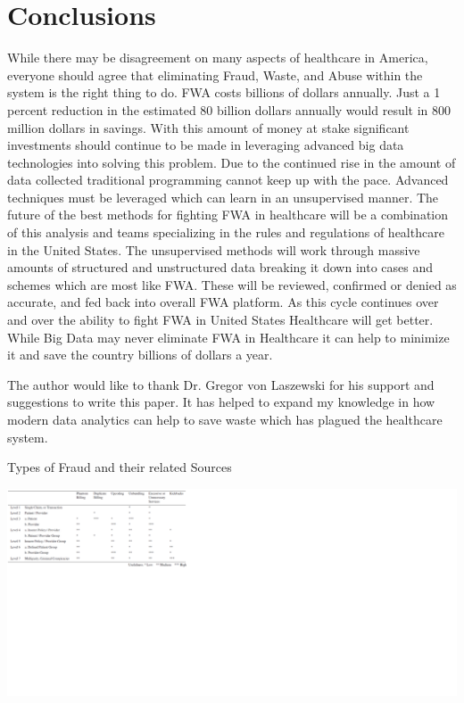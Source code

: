 \documentclass[sigconf]{acmart}
\begin{document}
\section{Conclusions}

While there may be disagreement on many aspects of healthcare in America, everyone should agree 
that eliminating Fraud, Waste, and Abuse within the system is the right thing to do.  FWA costs 
billions of dollars annually.  Just a 1 percent reduction in the estimated 80 billion dollars 
annually would result in 800 million dollars in savings.  With this amount of money at stake 
significant investments should continue to be made in leveraging advanced big data technologies 
into solving this problem.  Due to the continued rise in the amount of data collected traditional 
programming cannot keep up with the pace.  Advanced techniques must be leveraged which can learn 
in an unsupervised manner.  The future of the best methods for fighting FWA in healthcare will be 
a combination of this analysis and teams specializing in the rules and regulations of healthcare
in the United States.  The unsupervised methods will work through massive amounts of structured and 
unstructured data breaking it down into cases and schemes which are most like FWA.  These will be 
reviewed, confirmed or denied as accurate, and fed back into overall FWA platform.  As this cycle 
continues over and over the ability to fight FWA in United States Healthcare will get better.  
While Big Data may never eliminate FWA in Healthcare it can help to minimize it and save the
country billions of dollars a year.

\begin{acks}

  The author would like to thank Dr. Gregor von Laszewski for his
  support and suggestions to write this paper.  It has helped to expand my knowledge in how modern 
  data analytics can help to save waste which has plagued the healthcare system.

\end{acks}


 

\begin{table}[htb]
    \caption{Types of Fraud and their related Sources\cite{THORNTON20131252}}
    \label{fig:TypesofFraud}
    \includegraphics[scale=0.60]{images/TypesofFraud.png}
\end{table}
\end{document}

